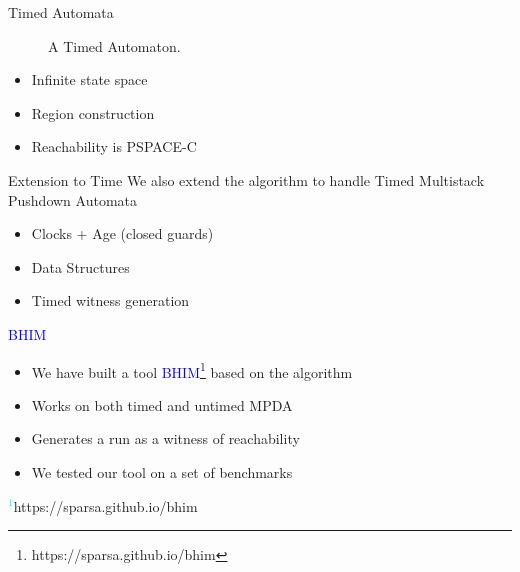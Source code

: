 \documentclass{beamer}
\begin{document}
\begin{frame}{Timed Automata~}
\begin{figure}[ht!]
     \caption{A Timed Automaton.}
    \label{fig:ex1}
  \end{figure}
 
  \begin{itemize}
     \item Infinite state space
      \item Region construction
        \item Reachability is PSPACE-C 
        \end{itemize}
      \end{frame}

\begin{frame}{Extension to Time}
  We also extend the algorithm to handle Timed Multistack Pushdown
  Automata 
  \begin{itemize}
  \item  Clocks + Age (closed guards)
  \item Data Structures
    \item Timed witness generation
  \end{itemize}    
 
  \end{frame}
 \begin{frame}{\textcolor{blue}{BHIM}}
  \begin{itemize}
  \item We have built a tool \textcolor{blue}{BHIM\footnote{https://sparsa.github.io/bhim}} based on the algorithm
      \item Works on both timed and untimed MPDA
      \item Generates a run as a witness
        of reachability
      \item We tested our tool on a set of benchmarks
    \end{itemize}
  
    {\scriptsize \textcolor{cyan}{$^1$}https://sparsa.github.io/bhim}
    \end{frame}
\end{document}
